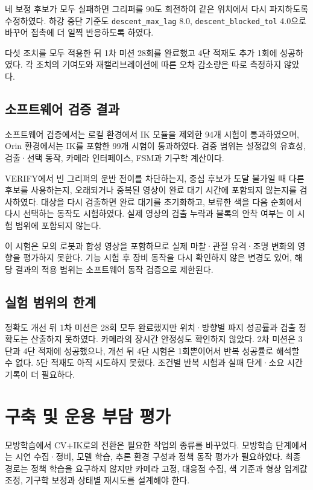 네 보정 후보가 모두 실패하면 그리퍼를 90도 회전하여 같은 위치에서 다시 파지하도록 수정하였다. 하강 중단 기준도 \texttt{descent\_max\_lag} 8.0, \texttt{descent\_blocked\_tol} 4.0으로 바꾸어 접촉에 더 일찍 반응하도록 하였다.

다섯 조치를 모두 적용한 뒤 1차 미션 28회를 완료했고 4단 적재도 추가 1회에 성공하였다. 각 조치의 기여도와 재캘리브레이션에 따른 오차 감소량은 따로 측정하지 않았다.

\subsection{소프트웨어 검증 결과}
소프트웨어 검증에서는 로컬 환경에서 IK 모듈을 제외한 94개 시험이 통과하였으며, Orin 환경에서는 IK를 포함한 99개 시험이 통과하였다. 검증 범위는 설정값의 유효성, 검출·선택 동작, 카메라 인터페이스, FSM과 기구학 계산이다.

VERIFY에서 빈 그리퍼의 운반 전이를 차단하는지, 중심 후보가 도달 불가일 때 다른 후보를 사용하는지, 오래되거나 중복된 영상이 완료 대기 시간에 포함되지 않는지를 검사하였다. 대상을 다시 검출하면 완료 대기를 초기화하고, 보류한 색을 다음 순회에서 다시 선택하는 동작도 시험하였다. 실제 영상의 검출 누락과 블록의 안착 여부는 이 시험 범위에 포함되지 않는다.

이 시험은 모의 로봇과 합성 영상을 포함하므로 실제 마찰·관절 유격·조명 변화의 영향을 평가하지 못한다. 기능 시험 후 장비 동작을 다시 확인하지 않은 변경도 있어, 해당 결과의 적용 범위는 소프트웨어 동작 검증으로 제한된다.

\subsection{실험 범위의 한계}
정확도 개선 뒤 1차 미션은 28회 모두 완료했지만 위치·방향별 파지 성공률과 검출 정확도는 산출하지 못하였다. 카메라의 장시간 안정성도 확인하지 않았다. 2차 미션은 3단과 4단 적재에 성공했으나, 개선 뒤 4단 시험은 1회뿐이어서 반복 성공률로 해석할 수 없다. 5단 적재도 아직 시도하지 못했다. 조건별 반복 시험과 실패 단계·소요 시간 기록이 더 필요하다.

\section{구축 및 운용 부담 평가}
모방학습에서 CV+IK로의 전환은 필요한 작업의 종류를 바꾸었다. 모방학습 단계에서는 시연 수집·정비, 모델 학습, 추론 환경 구성과 정책 동작 평가가 필요하였다. 최종 경로는 정책 학습을 요구하지 않지만 카메라 고정, 대응점 수집, 색 기준과 형상 임계값 조정, 기구학 보정과 상태별 재시도를 설계해야 한다.

